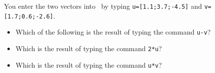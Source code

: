 \begin{activity}
You enter the two vectors into \script[1]\ by typing \verb|u=[1.1;3.7;-4.5]| and \verb|v=[1.7;0.6;-2.6]|.
\begin{itemize}
\item Which of the following is the result of typing the command \verb|u-v|?
\item Which is the result of typing the command \verb|2*u|? %
\item Which is the result of typing the command \verb|u*v|? %
\end{itemize}
\end{activity}






